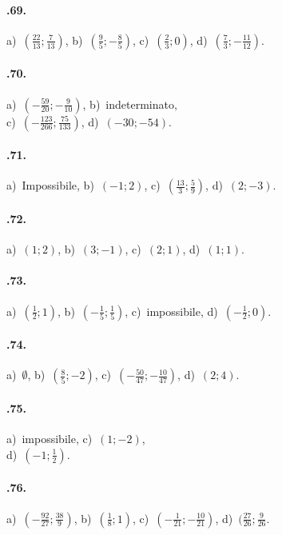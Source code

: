\begin{multicols}{2}
\paragraph{\thechapter.69.} a)~$\left(\frac{22}{13};\frac{7}{13}\right)$, b)~$\left(\frac{9}{5};-\frac{8}{5}\right)$,
c)~$(\frac{2}{3};0)$, d)~$\left(\frac{7}{3};-\frac{11}{12}\right)$.

\paragraph{\thechapter.70.} a)~$\left(-{\frac{59}{20}};-\frac{9}{10}\right)$, b)~indeterminato, \protect\\c)~$(-{\frac{123}{266}};\frac{75}{133})$,
d)~$(-30;-54)$.

\paragraph{\thechapter.71.} a)~Impossibile, b)~$(-1;2)$, c)~$\left(\frac{13}{3};\frac{5}{9}\right)$, d)~$(2;-3)$.

\paragraph{\thechapter.72.} a)~$(1;2)$, b)~$(3;-1)$, c)~$(2;1)$, d)~$(1;1)$.

\paragraph{\thechapter.73.} a)~$\left(\frac{1}{2};1\right)$, b)~$\left(-{\frac{1}{5}};\frac{1}{5}\right)$,
c)~impossibile, d)~$\left(-{\frac{1}{2}};0\right)$.

\paragraph{\thechapter.74.} a)~$\emptyset $, b)~$\left(\frac{8}{5};-2\right)$, c)~$(-\frac{50}{47};-\frac{10}{47})$,
d)~$(2;4)$.

\paragraph{\thechapter.75.} a)~impossibile, c)~$(1;-2)$,\protect\\ d)~$(-1;\frac{1}{2})$.

\paragraph{\thechapter.76.} a)~$(-{\frac{92}{27}};\frac{38}{9})$, b)~$(\frac{1}{8};1)$, c)~$(-{\frac{1}{21}};-{\frac{10}{21}})$, d)~$(\frac{27}{26};\frac{9}{26}$.


\end{multicols}
